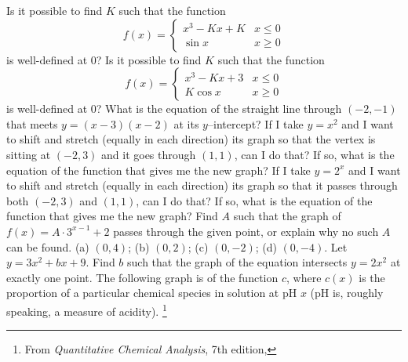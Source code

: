 \begin{questions}
  \question Is it possible to find $ K $ such that the function
            \begin{displaymath}
              f(x) = \begin{cases}
                      x^3 - Kx + K & x \leq 0\\
                      \sin x & x \geq 0
                    \end{cases}
            \end{displaymath}
            is well-defined at 0?
  \question Is it possible to find $ K $ such that the function
            \begin{displaymath}
              f(x) = \begin{cases}
                      x^3 - Kx + 3 & x \leq 0\\
                      K\cos x & x \geq 0
                    \end{cases}
            \end{displaymath}
            is well-defined at 0?
  \question What is the equation of the straight line through $ (-2,-1) $ that meets $ y = (x - 3)(x - 2) $ at its $ y$--intercept?
  \question If I take $ y = x^2 $ and I want to shift and stretch (equally in each direction) its graph so that the vertex is sitting
            at $ (-2, 3) $ and it goes through $ (1,1) $, can I do that? If so, what is the equation of the function that gives me the new graph?
  \question If I take $ y = 2^x $ and I want to shift and stretch (equally in each direction) its graph so that it passes through
            both $ (-2, 3) $ and $ (1,1) $, can I do that? If so, what is the equation of the function that gives me the new graph?
  \question Find $ A $ such that the graph of $ f(x) = A \cdot 3^{x - 1} + 2 $ passes through the given point, or explain why no such $ A $ can be found.
            (a) $ (0,4) $; (b) $ (0,2) $; (c) $ (0,-2) $; (d) $ (0,-4) $.
  \question Let $ y = 3x^2 + bx + 9 $. Find $ b $ such that the graph of the equation intersects $ y = 2x^2 $ at exactly one point.
  \question The following graph is of the function $ c $, where $ c(x) $ is the proportion of a particular chemical species in solution
            at pH $ x $ (pH is, roughly speaking, a measure of acidity). \footnote{From \emph{Quantitative Chemical Analysis}, 7th edition,
}
\end{questions}
